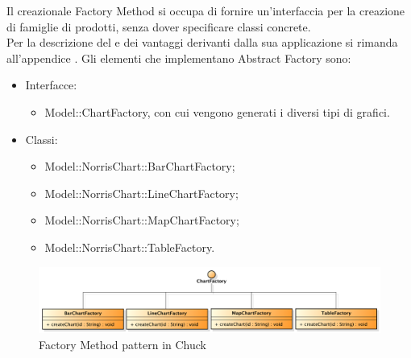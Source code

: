 			Il  creazionale Factory Method si occupa di fornire un'interfaccia per la creazione di famiglie di prodotti, senza dover specificare classi concrete. \\
			Per la descrizione del  e dei vantaggi derivanti dalla sua applicazione si rimanda all'appendice .
				Gli elementi che implementano Abstract Factory sono:
				\begin{itemize}
				\item Interfacce:
					\begin{itemize}
						\item Model::ChartFactory, con cui vengono generati i diversi tipi di grafici.
					\end{itemize}
				\item Classi:
					\begin{itemize}
						\item Model::NorrisChart::BarChartFactory;
						\item Model::NorrisChart::LineChartFactory;
						\item Model::NorrisChart::MapChartFactory;
						\item Model::NorrisChart::TableFactory.
					\end{itemize}
				\end{itemize}
				\begin{figure}[H]\centering
	        		\includegraphics[width=\textwidth]{SpecificaTecnica/Pics/DesignPatternNorris/Factory2}
	        		\caption{Factory Method pattern in Chuck}
	    			\end{figure}
				

